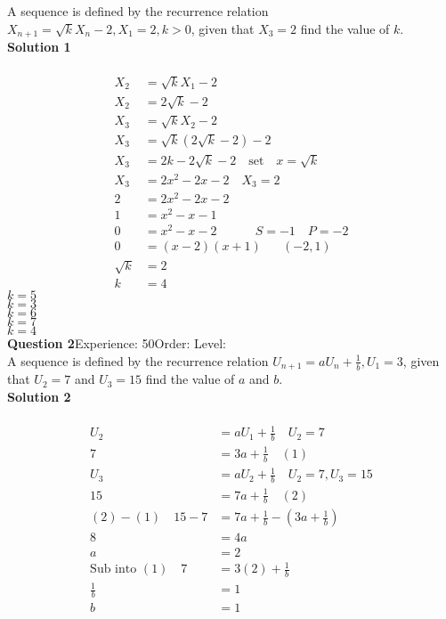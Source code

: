 \documentclass{article}
\begin{document}
A sequence is defined by the recurrence relation $X_{n+1}=\sqrt{k}X_n-2, X_1=2,k>0$, given that $X_3=2$ find the value of $k$.\\[4pt]
\noindent\textbf{Solution 1}\\[2pt]
\\[-10pt]\begin{align*}
X_2&=\sqrt{k}X_1-2\\[2pt]
X_2&=2\sqrt{k}-2\\[12pt]
X_3&=\sqrt{k}X_2-2\\[2pt]
X_3&=\sqrt{k}(2\sqrt{k}-2)-2\\[2pt]
X_3&=2k-2\sqrt{k}-2\quad \text{set}\quad x=\sqrt{k}\\[2pt]
X_3&=2x^2-2x-2 \quad X_3=2\\[2pt]
2&=2x^2-2x-2\\[2pt]
1&=x^2-x-1\\[2pt]
0&=x^2-x-2 \hspace{37pt} S=-1 \quad P=-2\\[2pt]
0&=(x-2)(x+1)\hspace{20pt} (-2,1)\\[2pt]
\sqrt{k}&=2\\[2pt]
k&=4
\end{align*}
$k=5$\\
$k=3$\\
$k=6$\\
$k=7$\\
$k=4$\\
\noindent\textbf{Question 2}\hspace{20pt}Experience: 50\hspace{20pt}Order: \hspace{20pt}Level: \\[2pt]
A sequence is defined by the recurrence relation $U_{n+1}=aU_n+\displaystyle\frac{1}{b}, U_1=3$, given that $U_2=7$ and $U_3=15$ find the value of $a$ and $b$.\\[4pt]
\noindent\textbf{Solution 2}\\[2pt]
\\[-10pt]\begin{align*}
U_2&=aU_1+\displaystyle\frac{1}{b} \quad U_2=7\\[2pt]
7&=3a+\displaystyle\frac{1}{b}\quad (1)\\[12pt]
U_3&=aU_2+\displaystyle\frac{1}{b} \quad U_2=7,U_3=15\\[2pt]
15&=7a+\displaystyle\frac{1}{b}\quad (2)\\[12pt]
(2)-(1)\quad 15-7&=7a+\displaystyle\frac{1}{b}-\left(3a+\displaystyle\frac{1}{b}\right)\\[2pt]
8&=4a\\[2pt]
a&=2\\[2pt]
\text{Sub into}\,\, (1)\quad 7&=3(2)+\displaystyle\frac{1}{b}\\[2pt]
\displaystyle\frac{1}{b}&=1\\[2pt]
b&=1\\[2pt]
\end{align*}
\end{document}
